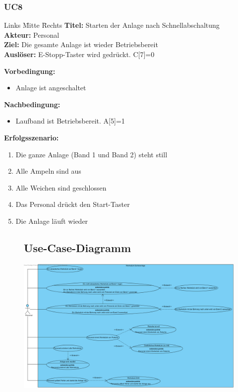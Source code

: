 \documentclass[oneside,a4paper,titlepage]{scrartcl} %
\begin{document}
\subsubsection{UC8}
\begin{tabbing}
 Links \= Mitte \= Rechts \kill
 \textbf{Titel:} \> \> Starten der Anlage nach Schnellabschaltung\\
 \textbf{Akteur:} \> \> Personal\\
 \textbf{Ziel:} \> \> Die gesamte Anlage ist wieder Betriebsbereit\\
 \textbf{Auslöser:} \> \> E-Stopp-Taster wird gedrückt. C[7]=0\\
\end{tabbing}
\textbf{Vorbedingung:}
\begin{itemize}
 \item Anlage ist angeschaltet
\end{itemize}
\textbf{Nachbedingung:}
\begin{itemize}
 \item Laufband ist Betriebsbereit. A[5]=1
\end{itemize}
\textbf{Erfolgsszenario:}
\begin{enumerate}
 \item Die ganze Anlage (Band 1 und Band 2) steht still
 \item Alle Ampeln sind aus
 \item Alle Weichen sind geschlossen
 \item Das Personal drückt den Start-Taster
 \item Die Anlage läuft wieder
\end{enumerate}

\begin{figure}
 \subsection{Use-Case-Diagramm}
 \centering\vfill\includegraphics[angle=90,scale=0.7]{imgs/UseCases.png}
\end{figure}
\end{document}
